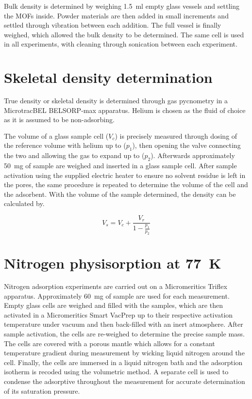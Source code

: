 Bulk density is determined by weighing \SI{1.5}{\milli\litre} empty 
glass vessels and settling the MOFs inside. Powder materials are then added
in small increments and settled through vibration between each
addition. The full vessel is finally weighed, which allowed the bulk
density to be determined. The same cell is used in all experiments,
with cleaning through sonication between each experiment.

\section{Skeletal density determination}\label{appx:char:truedensity}

True density or skeletal density is determined through gas pycnometry
in a MicrotracBEL BELSORP-max apparatus. Helium is chosen
as the fluid of choice as it is assumed to be non-adsorbing.

The volume of a glass sample cell (\(V_c\)) is precisely measured through
dosing of the reference volume with helium up to (\(p_1\)), then opening the valve 
connecting the two and allowing the gas to expand up to (\(p_2\)). 
Afterwards approximately \SI{50}{\milli\gram} of sample are weighed
and inserted in a glass sample cell. After sample activation using the
supplied electric heater to ensure no solvent residue is left in the pores,
the same procedure is repeated to determine the volume of the cell
and the adsorbent. With the volume of the sample determined, the
density can be calculated by.

\begin{equation}
%
    V_s = V_c + \frac{V_r}{1- \frac{p_1}{p_2}}
%
\end{equation}


\section{Nitrogen physisorption at \SI{77}{\kelvin}}\label{appx:char:N2phys}

Nitrogen adsorption experiments are carried out on a 
Micromeritics Triflex apparatus. Approximately \SI{60}{\milli\gram}
of sample are used for each measurement.
Empty glass cells are weighed and filled with the samples, which 
are then activated in a Micromeritics Smart VacPrep up to 
their respective activation
temperature under vacuum and then back-filled with an inert
atmosphere. After sample activation, the cells are re-weighed
to determine the precise sample mass. The cells are covered with
a porous mantle which allows for a constant temperature gradient
during measurement by wicking liquid nitrogen around the
cell. Finally, the cells are immersed in a liquid nitrogen bath
and the adsorption isotherm is recoded using the volumetric
method. A separate cell is used to condense the adsorptive 
throughout the measurement for accurate determination of
its saturation pressure.

